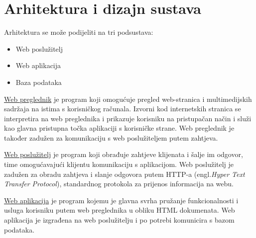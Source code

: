 \chapter{Arhitektura i dizajn sustava}
	Arhitektura se može podijeliti na tri podsustava:
	\begin{itemize}
		\item Web poslužitelj
		\item Web aplikacija
		\item Baza podataka
	\end{itemize}

	\underline{Web preglednik} je program koji omogućuje pregled web-stranica i multimedijskih sadržaja na istima s korisničkog računala. Izvorni kod internetskih stranica se interpretira na web preglednika i prikazuje korisniku na pristupačan način i služi kao glavna pristupna točka aplikaciji s korisničke strane. Web preglednik je također zadužen za komunikaciju s web poslužiteljem putem zahtjeva.
	
	\underline{Web poslužitelj} je program koji obrađuje zahtjeve klijenata i šalje im odgovor, time omogućavajući klijentu komunikaciju s aplikacijom. Web poslužitelj je zadužen za obradu zahtjeva i slanje odgovora putem HTTP-a (engl.\textit{Hyper Text Transfer Protocol}), standardnog protokola za prijenos informacija na webu.
	
	\underline{Web aplikacija} je program kojemu je glavna svrha pružanje funkcionalnosti i usluga korisniku putem web preglednika u obliku HTML dokumenata. Web aplikacija je izgrađena na web poslužitelju i po potrebi komunicira s bazom podataka.
	
